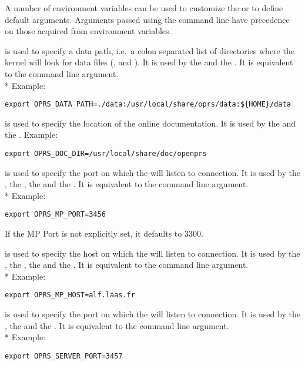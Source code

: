 A number of environment variables can be used to customize the
\CPK{} or to define default arguments. Arguments passed using the command line
have precedence on those acquired from environment variables.

\begin{description}

\item[\code{OPRS\_DATA\_PATH}] is used  to specify a data path, i.e.\ a colon separated
list of directories where the kernel will look for data files (,
 and ). It is used by the \CPK{} and the \XPK{}. It is
equivalent to the  command line argument.\\*
Example:
\begin{verbatim}
export OPRS_DATA_PATH=./data:/usr/local/share/oprs/data:${HOME}/data
\end{verbatim}


\item[\code{OPRS\_DOC\_DIR}] is used  to specify the location of the online \COPRSDE{}
documentation. It is used by the \XPK{} and the \OPE{}.
Example:
\begin{verbatim}
export OPRS_DOC_DIR=/usr/local/share/doc/openprs
\end{verbatim}

\item[\code{OPRS\_MP\_PORT}] is used  to specify the port on which the \MPA{} will
listen to connection. It is used by the \CPK{}, the \XPK{}, the \OPRSS{}
and the \MPA{}. It is equivalent to the  command line argument. \\*
Example:
\begin{verbatim}
export OPRS_MP_PORT=3456
\end{verbatim}
If the MP Port is not explicitly set, it defaults to 3300.

\item[\code{OPRS\_MP\_HOST}] is used  to specify the host on which the \MPA{} will
listen to connection. It is used by the \CPK{}, the \XPK{}, the \MPA{} and the
\OPRSS{}. It is equivalent to the  command line argument.\\*
Example:
\begin{verbatim}
export OPRS_MP_HOST=alf.laas.fr
\end{verbatim}

\item[\code{OPRS\_SERVER\_PORT}] is used to specify the port on which the
\OPRSS{} will listen to connection. It is used by the \CPK{}, the \XPK{}
and the \OPRSS{}. It is equivalent to the  command line argument.\\*
Example:
\begin{verbatim}
export OPRS_SERVER_PORT=3457
\end{verbatim}


\end{description}
